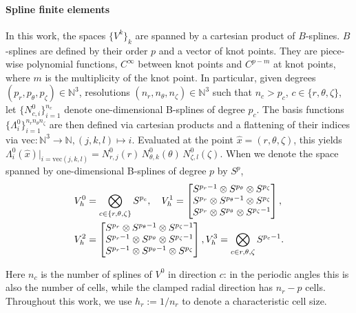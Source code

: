 \documentclass[%
 reprint,
 superscriptaddress,
 amsmath,amssymb,
 aps, nofootinbib, floatfix]{revtex4-2}
\begin{document}
\paragraph{Spline finite elements}
In this work, the spaces $\{ V^k \}_k$ are spanned by a cartesian product of $B$-splines. $B$-splines are defined by their order $p$ and a vector of knot points. They are piece-wise polynomial functions, $C^\infty$ between knot points and $C^{p-m}$ at knot points, where $m$ is the multiplicity of the knot point.
%
In particular, given degrees $(p_r, p_\theta, p_\zeta) \in \mathbb N^3$, resolutions $(n_r, n_\theta, n_\zeta) \in \mathbb N^3$ such that $n_c> p_c$, $c \in \{r, \theta, \zeta\}$, let $\{ N^0_{c, i} \}_{i=1}^{n_c}$ denote one-dimensional B-splines of degree $p_c$. The basis functions $\{ \Lambda^0_i \}_{i=1}^{n_r n_\theta n_\zeta}$ are then defined via cartesian products and a flattening of their indices via $\mathrm{vec}: \mathbb N^3 \to \mathbb N, (j,k,l) \mapsto i$. Evaluated at the point $\hat x = (r, \theta, \zeta)$, this yields $\Lambda^0_i(\hat x) \big |_{i = \mathrm{vec}(j,k,l)} = N^0_{r, j}(r) \, N^0_{\theta, k}(\theta) \, N^0_{\zeta, l}(\zeta)$.   
%
When we denote the space spanned by one-dimensional B-splines of degree $p$ by $S^p$,
\begin{align}
    V^0_h &= \bigotimes_{c \in \{r, \theta, \zeta\}} S^{p_c}, \quad
    V^1_h = \begin{bmatrix} 
        S^{p_r-1} \otimes S^{p_\theta} \otimes S^{p_\zeta} \\ 
        S^{p_r} \otimes S^{p_\theta-1} \otimes S^{p_\zeta} \\
        S^{p_r} \otimes S^{p_\theta} \otimes S^{p_\zeta-1}
    \end{bmatrix}, \notag \\ 
    V^2_h &= \begin{bmatrix} 
        S^{p_r} \otimes   S^{p_\theta-1} \otimes S^{p_\zeta-1} \\ 
        S^{p_r-1} \otimes S^{p_\theta} \otimes   S^{p_\zeta-1} \\
        S^{p_r-1} \otimes S^{p_\theta-1} \otimes S^{p_\zeta}
    \end{bmatrix}, 
    V^3_h = \bigotimes_{c \in {r, \theta, \zeta}} S^{p_c-1}.
\end{align}

Here $n_c$ is the number of splines of $V^0$ in direction $c$: in the periodic angles this is also the number of cells, while the clamped radial direction has $n_r - p$ cells. Throughout this work, we use $h_r := 1 / n_r$ to denote a characteristic cell size.
\end{document}
